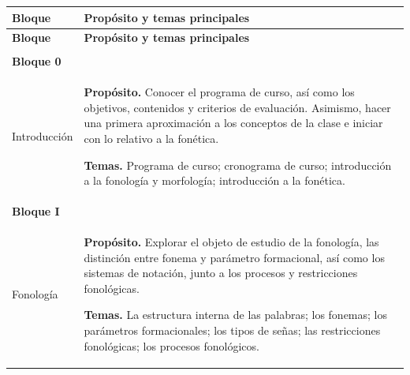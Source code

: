 %
%
%
\begin{longtable}{@{}
    >{\raggedright\arraybackslash}p{}
    >{\raggedright\arraybackslash}p{}
@{}}

\toprule
\textbf{Bloque} & \textbf{Propósito y temas principales} \\
\midrule
\endfirsthead

\toprule
\textbf{Bloque} & \textbf{Propósito y temas principales} \\
\midrule
\endhead

\midrule
\multicolumn{2}{r}{\small Continúa en la página siguiente.} \\
\endfoot

\bottomrule
\endlastfoot



\textbf{Bloque 0}\\
Introducción
&
\textbf{Propósito.}
Conocer el programa de curso, así como los objetivos, contenidos y criterios de evaluación.
Asimismo, hacer una primera aproximación a los conceptos de la clase e iniciar con lo relativo
a la fonética.

\textbf{Temas.}
Programa de curso; cronograma de curso; introducción a la fonología y morfología;
introducción a la fonética.
\\

\midrule



\textbf{Bloque I}\\
Fonología
&
\textbf{Propósito.}
Explorar el objeto de estudio de la fonología, las distinción entre 
fonema y parámetro formacional, así como los sistemas de notación, junto a los 
procesos y restricciones fonológicas. 

\textbf{Temas.}
La estructura interna de las palabras; los fonemas; los parámetros formacionales; 
los tipos de señas; las restricciones fonológicas; los procesos fonológicos.
\\


\end{longtable}
